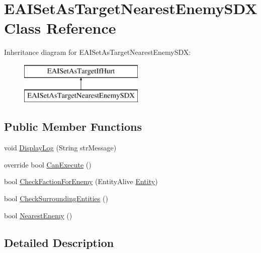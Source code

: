 \hypertarget{class_e_a_i_set_as_target_nearest_enemy_s_d_x}{}\section{E\+A\+I\+Set\+As\+Target\+Nearest\+Enemy\+S\+DX Class Reference}
\label{class_e_a_i_set_as_target_nearest_enemy_s_d_x}
Inheritance diagram for E\+A\+I\+Set\+As\+Target\+Nearest\+Enemy\+S\+DX\+:\begin{figure}[H]
\begin{center}
\leavevmode
\includegraphics[height=2.000000cm]{d6/dd2/class_e_a_i_set_as_target_nearest_enemy_s_d_x}
\end{center}
\end{figure}
\subsection*{Public Member Functions}
\begin{DoxyCompactItemize}
\item 
void \mbox{\hyperlink{class_e_a_i_set_as_target_nearest_enemy_s_d_x_a628fcb008c20c6a59f8663fb57c719fe}{Display\+Log}} (String str\+Message)
\item 
override bool \mbox{\hyperlink{class_e_a_i_set_as_target_nearest_enemy_s_d_x_a3ec7b2bfb9923c2bf0c499c98b808ab2}{Can\+Execute}} ()
\item 
bool \mbox{\hyperlink{class_e_a_i_set_as_target_nearest_enemy_s_d_x_ab390e79641b3e56767329a36c6bc11fc}{Check\+Faction\+For\+Enemy}} (Entity\+Alive \mbox{\hyperlink{_the_01_restless_01_curse_2_config_2_localization_8txt_a831452d5736d8c492ddd792b09c12cde}{Entity}})
\item 
bool \mbox{\hyperlink{class_e_a_i_set_as_target_nearest_enemy_s_d_x_ac55dbb450589d7d1a9108d6a4cd74f03}{Check\+Surrounding\+Entities}} ()
\item 
bool \mbox{\hyperlink{class_e_a_i_set_as_target_nearest_enemy_s_d_x_a7a78d543de832cbace9a0a7d0c7b0cdd}{Nearest\+Enemy}} ()
\end{DoxyCompactItemize}


\subsection{Detailed Description}


